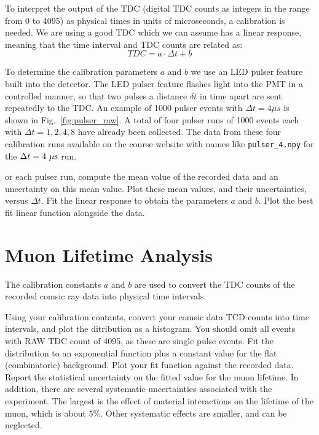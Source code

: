 To interpret the output of the TDC (digital TDC counts as integers in
the range from 0 to 4095) as physical times in units of microseconds,
a calibration is needed.  We are using a good TDC which we can assume has a linear response, meaning that the time interval and TDC counts are related as:
\begin{displaymath}
TDC = a \cdot \Delta t  + b 
\end{displaymath}

To determine the calibration parameters $a$ and $b$ we use an LED
pulser feature built into the detector.  The LED pulser feature
flashes light into the PMT in a controlled manner, so that two pulses
a distance $\delta t$ in time apart are sent repeatedly to the TDC.
An example of 1000 pulser events with $\Delta t = 4 \mu s$ is shown in
Fig.~\ref{fig:pulser_raw}.  A total of four pulser runs of 1000 events
each with $\Delta t = 1,2,4,8$ have already been collected.  The data
from these four calibration runs available on the course website with
names like {\tt pulser{\_}4.npy} for the $\Delta t = 4~\rm \mu s$ run.

\begin{plot}
or each pulser run, compute the mean value of the recorded data and an uncertainty on this mean value.
Plot these mean values, and their uncertainties, versus $\Delta t$.  Fit the linear response to obtain the parameters $a$ and $b$.  Plot the best fit linear function alongside the data.
\end{plot}

\section{Muon Lifetime Analysis}

The calibration constants $a$ and $b$ are used to convert the TDC
counts of the recorded comsic ray data into physical time intervals.

\begin{plot}
Using your calibration contants, convert your comsic data TCD counts
into time intervals, and plot the ditribution as a histogram.  You
should omit all events with RAW TDC count of 4095, as these are single
pulse events.  Fit the distribution to an exponential function plus a
constant value for the flat (combinatoric) background.  Plot your fit
function against the recorded data.  Report the statistical
uncertainty on the fitted value for the muon lifetime.  In addition,
there are several systematic uncertainties associated with the
experiment.  The largest is the effect of material interactions on the
lifetime of the muon, which is about $5\%$.  Other systematic effects
are smaller, and can be neglected.
\end{plot}

